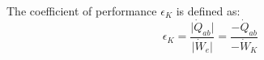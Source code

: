The coefficient of performance \( \epsilon_K \) is defined as:  
\[
\epsilon_K = \frac{\lvert \dot{Q}_{ab} \rvert}{\lvert \dot{W}_e \rvert} = \frac{-\dot{Q}_{ab}}{-\dot{W}_K}
\]